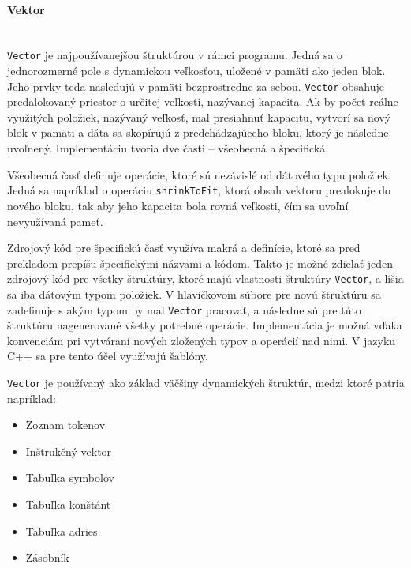 \documentclass[12pt,a4paper,titlepage,final]{article}
\begin{document}
\paragraph{Vektor}\mbox{}\\

\texttt{Vector} je najpoužívanejšou štruktúrou v rámci programu. Jedná sa o jednorozmerné pole s
dynamickou veľkosťou, uložené v pamäti ako jeden blok. Jeho prvky teda nasledujú v pamäti bezprostredne
za sebou. \texttt{Vector} obsahuje predalokovaný priestor o určitej veľkosti, nazývanej kapacita.
Ak by počet reálne využitých položiek, nazývaný veľkosť, mal presiahnuť kapacitu, vytvorí
sa nový blok v pamäti a dáta sa skopírujú z predchádzajúceho bloku, ktorý je následne uvoľnený.
Implementáciu tvoria dve časti -- všeobecná a špecifická.

Všeobecná časť definuje operácie, ktoré sú nezávislé od dátového typu položiek. Jedná sa napríklad
o operáciu \texttt{shrinkToFit}, ktorá obsah vektoru prealokuje do nového bloku, tak aby jeho
kapacita bola rovná veľkosti, čím sa uvoľní nevyužívaná pameť. 

Zdrojový kód pre špecifickú časť využíva makrá a definície, ktoré sa pred prekladom prepíšu
špecifickými názvami a kódom. Takto je možné zdielať jeden zdrojový kód pre všetky štruktúry,
ktoré majú vlastnosti štruktúry \texttt{Vector}, a líšia sa iba dátovým typom položiek. V hlavičkovom
súbore pre novú štruktúru sa zadefinuje s akým typom by mal \texttt{Vector} pracovať, 
a následne sú pre túto štruktúru nagenerované všetky potrebné operácie. Implementácia je možná vďaka
konvenciám pri vytváraní nových zložených typov a operácií nad nimi. V jazyku C++ sa pre tento účel
využívajú šablóny.

\texttt{Vector} je používaný ako základ väčšiny dynamických štruktúr, medzi ktoré patria napríklad:
\begin{itemize}
    \itemsep0em
    \item Zoznam tokenov
    \item Inštrukčný vektor
    \item Tabuľka symbolov
    \item Tabuľka konštánt
    \item Tabuľka adries
    \item Zásobník
\end{itemize}

\end{document}
